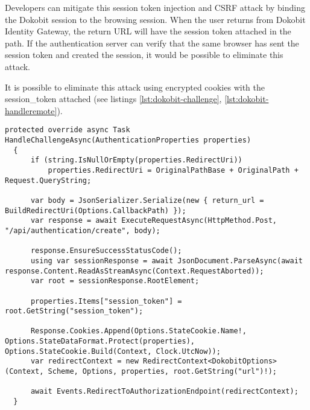 Developers can mitigate this session token injection and CSRF attack by binding the Dokobit session to the browsing session. When the user returns from Dokobit Identity Gateway, the return URL will have the session token attached in the path. If the authentication server can verify that the same browser has sent the session token and created the session, it would be possible to eliminate this attack.

It is possible to eliminate this attack using encrypted cookies with the session\_token attached (see listings \ref{lst:dokobit-challenge}, \ref{lst:dokobit-handleremote}).

\begin{lstlisting}[caption={Handling Dokobit session creation}, label={lst:dokobit-challenge}]
  protected override async Task HandleChallengeAsync(AuthenticationProperties properties)
  {
      if (string.IsNullOrEmpty(properties.RedirectUri))
          properties.RedirectUri = OriginalPathBase + OriginalPath + Request.QueryString;

      var body = JsonSerializer.Serialize(new { return_url = BuildRedirectUri(Options.CallbackPath) });
      var response = await ExecuteRequestAsync(HttpMethod.Post, "/api/authentication/create", body);

      response.EnsureSuccessStatusCode();
      using var sessionResponse = await JsonDocument.ParseAsync(await response.Content.ReadAsStreamAsync(Context.RequestAborted));
      var root = sessionResponse.RootElement;

      properties.Items["session_token"] = root.GetString("session_token");

      Response.Cookies.Append(Options.StateCookie.Name!, Options.StateDataFormat.Protect(properties), Options.StateCookie.Build(Context, Clock.UtcNow));
      var redirectContext = new RedirectContext<DokobitOptions>(Context, Scheme, Options, properties, root.GetString("url")!);

      await Events.RedirectToAuthorizationEndpoint(redirectContext);
  }
\end{lstlisting}


